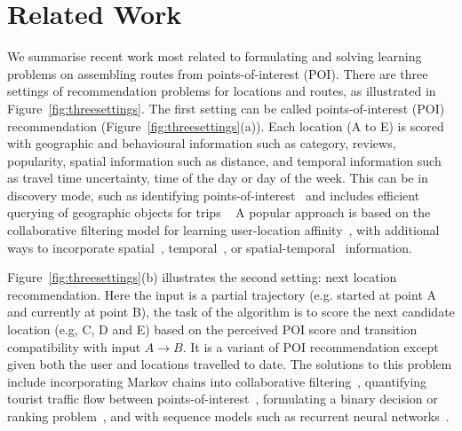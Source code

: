 
\section{Related Work}
\label{sec:relatedwork}

We summarise recent work most related to formulating and solving learning problems on assembling routes from points-of-interest (POI).
%
There are three settings of recommendation problems for locations and routes, as illustrated in Figure~\ref{fig:threesettings}.
The first setting can be called points-of-interest (POI) recommendation (Figure~\ref{fig:threesettings}(a)). Each location (A to E) is scored with geographic and behavioural information such as category, reviews, popularity, spatial information such as distance, and temporal information such as travel time uncertainty, time of the day or day of the week.
This can be in discovery mode, such as identifying points-of-interest~\cite{zheng2009mining,li2015instagram} and includes efficient querying of geographic objects for trips ~\cite{hashem2015efficient}
A popular approach is based on the collaborative filtering model
for learning user-location affinity~\cite{shi2011personalized}, with additional ways to incorporate spatial~\cite{lian2014geomf,liu2014exploiting}, temporal~\cite{yuan2013timeaware,hsieh2014mining,gao2013temporal}, or spatial-temporal~\cite{yuan2014graph} information.

Figure~\ref{fig:threesettings}(b) illustrates the second setting: next location recommendation.
Here the input is a partial trajectory (e.g. started at point A and currently at point B), the task of the algorithm is to score the next candidate location (e.g, C, D and E) based on the perceived POI score and transition compatibility with input $A\rightarrow B$.
It is a variant of POI recommendation except given both the user and locations travelled to date. The solutions to this problem include incorporating Markov chains into collaborative filtering~\cite{fpmc10,ijcai13,zhang2015location},
quantifying tourist traffic flow between points-of-interest~\cite{zheng2012patterns},
formulating a binary decision or ranking problem~\cite{baraglia2013learnext}, and with sequence models such as recurrent neural networks~\cite{aaai16}.


